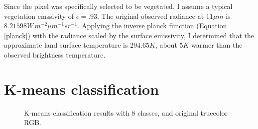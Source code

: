 \documentclass[12pt]{article}
\begin{document}
Since the pixel was specifically selected to be vegetated, I assume a typical vegetation emssivity of $\epsilon = .93$. The original observed radiance at $11\mu m$ is $8.21598 W\,m^{-2}\mu m^{-1} sr^{-1}$. Applying the inverse planck function (Equation \ref{planck}) with the radiance scaled by the surface emissivity, I determined that the approximate land surface temperature is $294.65K$, about $5K$ warmer than the observed brightness temperature.

\clearpage

\section{K-means classification}

\begin{figure}[h!]
    \centering

    \caption{K-means classification results with 8 classes, and original truecolor RGB.}
    \label{p8_km}
\end{figure}
\end{document}
